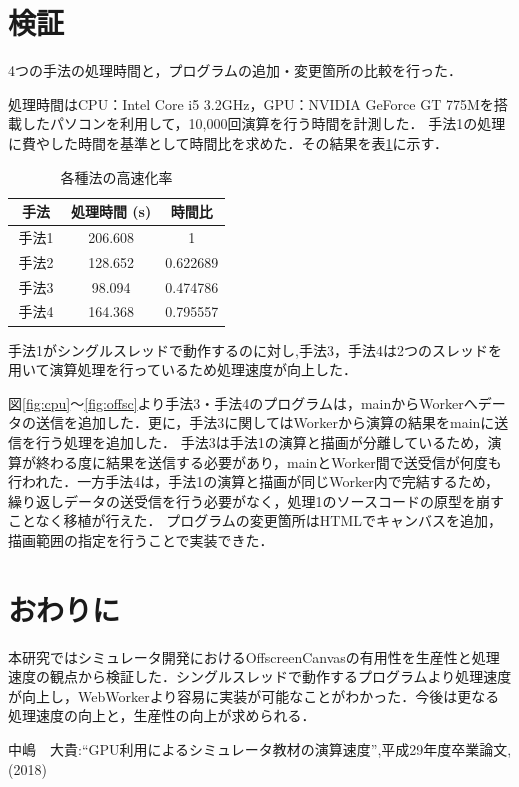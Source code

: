 \documentclass[twocolumn,10pt,a4j]{jsarticle}
\begin{document}
\vspace{-30pt}
\section{検証}
4つの手法の処理時間と，プログラムの追加・変更箇所の比較を行った．

処理時間はCPU：Intel Core i5 3.2GHz，GPU：NVIDIA GeForce GT 775Mを搭載したパソコンを利用して，10,000回演算を行う時間を計測した．
手法1の処理に費やした時間を基準として時間比を求めた．その結果を表\ref{tab:tab2}に示す．
\begin{table} [H]
\vspace{6pt}
\centering
\caption{各種法の高速化率}
\vspace{4pt}
	\begin{tabular} {| c | c | c | } \hline
	手法　& 処理時間  (s)  & 時間比 \\ \hline
	手法1 & 206.608 & 1 \\ \hline 
	手法2 & 128.652 & 0.622689 \\ \hline
	手法3 & 98.094 & 0.474786 \\ \hline
	手法4 & 164.368 & 0.795557 \\ \hline
	\end{tabular} 
	\label{tab:tab2}
\end{table}
手法1がシングルスレッドで動作するのに対し,手法3，手法4は2つのスレッドを用いて演算処理を行っているため処理速度が向上した．

図\ref{fig:cpu}〜\ref{fig:offsc}より手法3・手法4のプログラムは，mainからWorkerへデータの送信を追加した．更に，手法3に関してはWorkerから演算の結果をmainに送信を行う処理を追加した．
手法3は手法1の演算と描画が分離しているため，演算が終わる度に結果を送信する必要があり，mainとWorker間で送受信が何度も行われた．一方手法4は，手法1の演算と描画が同じWorker内で完結するため，繰り返しデータの送受信を行う必要がなく，処理1のソースコードの原型を崩すことなく移植が行えた．
プログラムの変更箇所はHTMLでキャンバスを追加，描画範囲の指定を行うことで実装できた．
\section{おわりに}
本研究ではシミュレータ開発におけるOffscreenCanvasの有用性を生産性と処理速度の観点から検証した．シングルスレッドで動作するプログラムより処理速度が向上し，WebWorkerより容易に実装が可能なことがわかった．今後は更なる処理速度の向上と，生産性の向上が求められる．
\begin{thebibliography}{99}

	中嶋　大貴:``GPU利用によるシミュレータ教材の演算速度'',平成29年度卒業論文,(2018)
\end{thebibliography}
\end{document}
